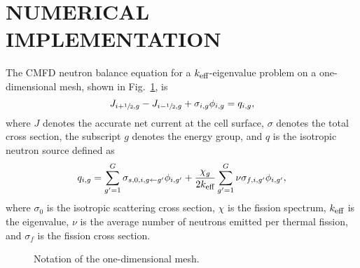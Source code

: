 \documentclass[letterpaper]{physor2020}
\newcommand{\keff}{{\ensuremath{k_{\textrm{\scriptsize{eff}}}}}}
\newcommand{\hzi}{\ensuremath{\sfrac{1}{2}}}
\newcommand{\keff}{{\ensuremath{k_{\textrm{\scriptsize{eff}}}}}}
\newcommand{\hzi}{\ensuremath{\sfrac{1}{2}}}
\begin{document}
\section{NUMERICAL IMPLEMENTATION}
\label{sec:RM-num}

The CMFD neutron balance equation for a $\keff$-eigenvalue problem on a one-dimensional mesh, shown in Fig.~\ref{fig:mesh1D}, is
\begin{equation}\label{eq:balance}
J_{i+\hzi,g} - J_{i-\hzi,g} + \sigma_{i,g} \phi_{i,g} = q_{i,g}, 
\end{equation}	
where $J$ denotes the accurate net current at the cell surface, $\sigma$ denotes the total cross section, the subscript $g$ denotes the energy group, and $q$ is the isotropic neutron source defined as
\begin{equation}\label{eq:qsrc}
q_{i,g} = \sum\limits_{g'=1}^G\sigma_{s,0,i,g\leftarrow g'}\phi_{i,g'} +
\frac{\chi_g}{2\keff}\sum\limits_{g'=1}^G\nu\sigma_{f,i,g'}\phi_{i,g'},
\end{equation}	
where $\sigma_0$ is the isotropic scattering cross section, $\chi$ is the fission spectrum, $\keff$ is the eigenvalue, $\nu$ is the average number of neutrons emitted per thermal fission, and $\sigma_f$ is the fission cross section.   

\begin{figure}[htbp!] 
	\centering
	\caption{Notation of the one-dimensional mesh.}
	\label{fig:mesh1D}
\end{figure}
 
\end{document}
